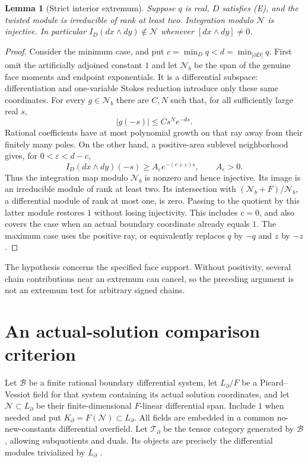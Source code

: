 \documentclass[11pt]{article}
\numberwithin{equation}{section}
\newtheorem{lemma}[lemma]{Lemma}
\theoremstyle{definition}
\theoremstyle{remark}
\newcommand{\Ncal}{\mathcal N}
\newcommand{\Tcal}{\mathcal T}
\begin{document}
\begin{lemma}[Strict interior extremum]\label{lem:extremum}
Suppose $q$ is real, $D$ satisfies (E), and the twisted module is irreducible
of rank at least two. Integration modulo $\Ncal$ is injective. In particular
$I_D(dx\wedge dy)\notin\Ncal$ whenever $[dx\wedge dy]\ne0$.
\end{lemma}
\begin{proof}
Consider the minimum case, and put
$c=\min_Dq<d=\min_{|\partial D|}q$.
First omit the artificially adjoined constant $1$ and let $\Ncal_b$ be the
span of the genuine face moments and endpoint exponentials. It is a
differential subspace: differentiation and one-variable Stokes reduction
introduce only these same coordinates. For every $g\in\Ncal_b$ there are
$C,N$ such that, for all sufficiently large real $s$,
\[
 |g(-s)|\le Cs^N e^{-ds}.
\]
Rational coefficients have at most polynomial growth on that ray away from
their finitely many poles. On the other hand, a positive-area sublevel
neighborhood gives, for $0<\varepsilon<d-c$,
\[
 I_D(dx\wedge dy)(-s)\ge A_\varepsilon e^{-(c+\varepsilon)s},
 \qquad A_\varepsilon>0.
\]
Thus the integration map modulo $\Ncal_b$ is nonzero and hence injective.
Its image is an irreducible module of rank at least two. Its intersection
with $(\Ncal_b+F)/\Ncal_b$, a differential module of rank at most one, is
zero. Passing to the quotient by this latter module restores $1$ without
losing injectivity. This includes $c=0$, and also covers the case when an
actual boundary coordinate already equals $1$. The maximum case uses the
positive ray, or equivalently replaces $q$ by $-q$ and $z$ by $-z$.
\end{proof}

The hypothesis concerns the specified face support. Without positivity,
several chain contributions near an extremum can cancel, so the preceding
argument is not an extremum test for arbitrary signed chains.

\section{An actual-solution comparison criterion}\label{sec:criterion}
Let $\mathcal B$ be a finite rational boundary differential system, let
$L_\partial/F$ be a Picard--Vessiot field for that system containing its
actual solution coordinates, and let $\Ncal\subset L_\partial$ be their
finite-dimensional $F$-linear differential span. Include $1$ when needed and put $K_\partial=F(\Ncal)\subset L_\partial$. All fields are embedded in a common no-new-constants differential overfield.
Let $\Tcal_\partial$ be the tensor category generated by $\mathcal B$,
allowing subquotients and duals. Its objects are precisely the differential
modules trivialized by $L_\partial$ \cite[Theorem 1.5.2]{Singer}.
\end{document}
